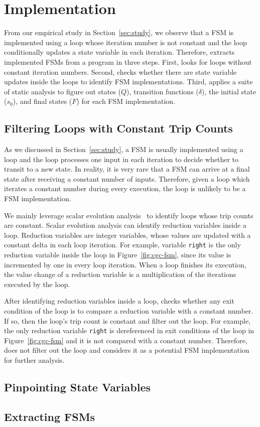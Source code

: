 \section{Implementation}
\label{sec:impl}

From our empirical study in Section~\ref{sec:study},
we observe that a FSM is implemented using a loop 
whose iteration number is not constant  
and the loop conditionally updates a state variable in each iteration. 
Therefore, \Tool{} extracts implemented FSMs from a program in three steps.
First, \Tool{} looks for loops without constant iteration numbers. 
Second, \Tool{} checks whether there are state 
variable updates inside the loops to identify FSM implementations. 
Third, \Tool{} applies a suite 
of static analysis to figure out states ($Q$), 
transition functions ($\delta$), the initial state ($s_0$),
and final states ($F$) for each FSM implementation. 


\subsection{Filtering Loops with Constant Trip Counts}
As we discussed in Section~\ref{sec:study},
a FSM is usually implemented using a loop 
and the loop processes one input in each iteration to decide 
whether to transit to a new state. 
In reality, it is very rare that a FSM can arrive at a final state 
after receiving a constant number of inputs. 
Therefore, given a loop which iterates a constant 
number during every execution, 
the loop is unlikely to be a FSM implementation. 


We mainly leverage scalar evolution analysis~\cite{scalar-1,scalar-2,scalar-3} 
to identify loops whose trip counts are constant. 
Scalar evolution analysis can identify reduction variables inside a loop.
Reduction variables are integer variables, 
whose values are updated 
with a constant delta in each loop iteration. 
For example, variable \texttt{right} is the only reduction 
variable inside the loop in Figure~\ref{fig:cgc-fsm}, 
since its value is incremented by one in every loop iteration.  
When a loop finishes its execution, the value change of a 
reduction variable is a multiplication of 
the iterations executed by the loop. 

After identifying reduction variables inside a loop,
\Tool{} checks whether any exit condition of the loop is to compare 
a reduction variable with a constant number. 
If so, then the loop’s trip count is constant and \Tool{} filter out the loop. 
For example, the only reduction variable \texttt{right} is dereferenced 
in exit conditions of the loop in Figure~\ref{fig:cgc-fsm} 
and it is not compared with a constant number.
Therefore, \Tool{} does not filter out the loop and considers it 
as a potential FSM implementation 
for further analysis. 





\subsection{Pinpointing State Variables}


\subsection{Extracting FSMs}

